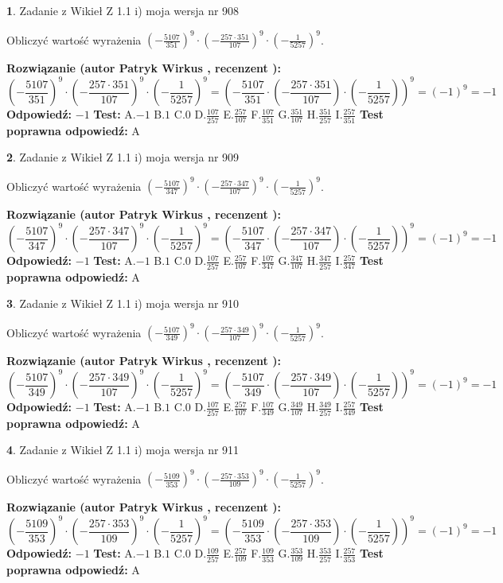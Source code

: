 \documentclass[12pt, a4paper]{article}
\theoremstyle{definition} %
\newtheorem{zad}{}
\newcommand{\zadStart}[1]{\begin{zad}#1\newline}
\newcommand{\zadStop}{\end{zad}}
\newcommand{\rozwStart}[2]{\noindent \textbf{Rozwiązanie (autor #1 , recenzent #2): }\newline}
\newcommand{\rozwStop}{\newline}
\newcommand{\odpStart}{\noindent \textbf{Odpowiedź:}\newline}
\newcommand{\odpStop}{\newline}
\newcommand{\testStart}{\noindent \textbf{Test:}\newline}
\newcommand{\testStop}{\newline}
\newcommand{\kluczStart}{\noindent \textbf{Test poprawna odpowiedź:}\newline}
\newcommand{\kluczStop}{\newline}
\begin{document}
\zadStart{Zadanie z Wikieł Z 1.1 i) moja wersja nr 908}

Obliczyć wartość wyrażenia $(-\frac{5107}{351})^{9} \cdot (-\frac{257 \cdot 351}{107})^{9} \cdot (-\frac{1}{5257})^{9}$.
\zadStop
\rozwStart{Patryk Wirkus}{}
$$(-\frac{5107}{351})^{9} \cdot (-\frac{257 \cdot 351}{107})^{9} \cdot (-\frac{1}{5257})^{9} = (-\frac{5107}{351} \cdot (-\frac{257 \cdot 351}{107}) \cdot (-\frac{1}{5257}))^{9} = (-1)^{9} = -1$$
\rozwStop
\odpStart
$-1$
\odpStop
\testStart
A.$-1$ B.$1$ C.$0$ D.$\frac{107}{257}$ E.$\frac{257}{107}$
F.$\frac{107}{351}$ G.$\frac{351}{107}$
H.$\frac{351}{257}$
I.$\frac{257}{351}$
\testStop
\kluczStart
A
\kluczStop



\zadStart{Zadanie z Wikieł Z 1.1 i) moja wersja nr 909}

Obliczyć wartość wyrażenia $(-\frac{5107}{347})^{9} \cdot (-\frac{257 \cdot 347}{107})^{9} \cdot (-\frac{1}{5257})^{9}$.
\zadStop
\rozwStart{Patryk Wirkus}{}
$$(-\frac{5107}{347})^{9} \cdot (-\frac{257 \cdot 347}{107})^{9} \cdot (-\frac{1}{5257})^{9} = (-\frac{5107}{347} \cdot (-\frac{257 \cdot 347}{107}) \cdot (-\frac{1}{5257}))^{9} = (-1)^{9} = -1$$
\rozwStop
\odpStart
$-1$
\odpStop
\testStart
A.$-1$ B.$1$ C.$0$ D.$\frac{107}{257}$ E.$\frac{257}{107}$
F.$\frac{107}{347}$ G.$\frac{347}{107}$
H.$\frac{347}{257}$
I.$\frac{257}{347}$
\testStop
\kluczStart
A
\kluczStop



\zadStart{Zadanie z Wikieł Z 1.1 i) moja wersja nr 910}

Obliczyć wartość wyrażenia $(-\frac{5107}{349})^{9} \cdot (-\frac{257 \cdot 349}{107})^{9} \cdot (-\frac{1}{5257})^{9}$.
\zadStop
\rozwStart{Patryk Wirkus}{}
$$(-\frac{5107}{349})^{9} \cdot (-\frac{257 \cdot 349}{107})^{9} \cdot (-\frac{1}{5257})^{9} = (-\frac{5107}{349} \cdot (-\frac{257 \cdot 349}{107}) \cdot (-\frac{1}{5257}))^{9} = (-1)^{9} = -1$$
\rozwStop
\odpStart
$-1$
\odpStop
\testStart
A.$-1$ B.$1$ C.$0$ D.$\frac{107}{257}$ E.$\frac{257}{107}$
F.$\frac{107}{349}$ G.$\frac{349}{107}$
H.$\frac{349}{257}$
I.$\frac{257}{349}$
\testStop
\kluczStart
A
\kluczStop



\zadStart{Zadanie z Wikieł Z 1.1 i) moja wersja nr 911}

Obliczyć wartość wyrażenia $(-\frac{5109}{353})^{9} \cdot (-\frac{257 \cdot 353}{109})^{9} \cdot (-\frac{1}{5257})^{9}$.
\zadStop
\rozwStart{Patryk Wirkus}{}
$$(-\frac{5109}{353})^{9} \cdot (-\frac{257 \cdot 353}{109})^{9} \cdot (-\frac{1}{5257})^{9} = (-\frac{5109}{353} \cdot (-\frac{257 \cdot 353}{109}) \cdot (-\frac{1}{5257}))^{9} = (-1)^{9} = -1$$
\rozwStop
\odpStart
$-1$
\odpStop
\testStart
A.$-1$ B.$1$ C.$0$ D.$\frac{109}{257}$ E.$\frac{257}{109}$
F.$\frac{109}{353}$ G.$\frac{353}{109}$
H.$\frac{353}{257}$
I.$\frac{257}{353}$
\testStop
\kluczStart
A
\kluczStop
\end{document}
